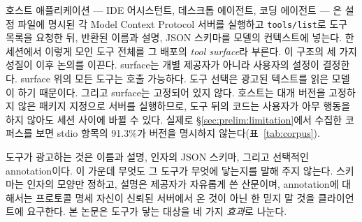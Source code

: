 \documentclass[acmsmall,screen,review,anonymous]{acmart}
\begin{document}
호스트 애플리케이션 --- IDE 어시스턴트, 데스크톱 에이전트, 코딩 에이전트 --- 은 설정 파일에 명시된 각 Model Context Protocol 서버를 실행하고 \texttt{tools/list}로 도구 목록을 요청한 뒤, 반환된 이름과 설명, JSON 스키마를 모델의 컨텍스트에 넣는다. 한 세션에서 이렇게 모인 도구 전체를 그 배포의 \emph{tool surface}라 부른다. 이 구조의 세 가지 성질이 이후 논의를 이끈다. surface는 개별 제공자가 아니라 사용자의 설정이 결정한다. surface 위의 모든 도구는 호출 가능하다. 도구 선택은 광고된 텍스트를 읽은 모델이 하기 때문이다. 그리고 surface는 고정되어 있지 않다. 호스트는 대개 버전을 고정하지 않은 패키지 지정으로 서버를 실행하므로, 도구 뒤의 코드는 사용자가 아무 행동을 하지 않아도 세션 사이에 바뀔 수 있다. 실제로 \S\ref{sec:prelim:limitation}에서 수집한 코퍼스를 보면 stdio 항목의 91.3\%가 버전을 명시하지 않는다(표~\ref{tab:corpus}).

도구가 광고하는 것은 이름과 설명, 인자의 JSON 스키마, 그리고 선택적인 annotation이다. 이 가운데 무엇도 그 도구가 무엇에 닿는지를 말해 주지 않는다. 스키마는 인자의 모양만 정하고, 설명은 제공자가 자유롭게 쓴 산문이며, annotation에 대해서는 프로토콜 명세 자신이 신뢰된 서버에서 온 것이 아닌 한 믿지 말 것을 클라이언트에 요구한다. 본 논문은 도구가 닿는 대상을 네 가지 \emph{효과}로 나눈다.
\end{document}
